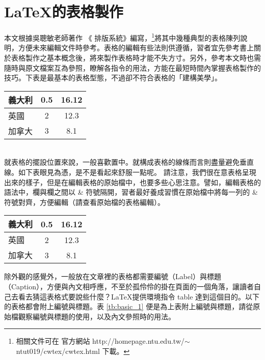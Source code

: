 %
\chapter{ \LaTeX  {\MB 的表格製作}}
本文根據吳聰敏老師著作 《\cw{} 排版系統》編寫，\footnote{相關文件可在 \cw{} 官方網站  http://homepage.ntu.edu.tw/$\sim$ntut019/cwtex/cwtex.html 下載。}將其中幾種典型的表格陳列說明，方便未來編輯文件時參考。表格的編輯有些法則供遵循，習者宜先參考書上關於表格製作之基本概念後，將來製作表格時才能不失方寸。另外，參考本文時也需隨時與原文檔案互為參照，瞭解各指令的用法，方能在最短時間內掌握表格製作的技巧。下表是最基本的表格型態，不過卻不符合表格的「建構美學」。\\

\begin{tabular}{|l|c|c|}%
\hline  %
  義大利	& 0.5	& 16.12		\\\hline  %
  英國	& 2     	& 12.3		\\\hline
  加拿大	& 3     	& 8.1		\\\hline
\end{tabular}\\

就表格的擺設位置來說，一般喜歡置中。就構成表格的線條而言則盡量避免垂直線。如下表眼見為憑，是不是看起來舒服一點呢。
請注意，我們很在意表格呈現出來的樣子，但是在編輯表格的原始檔中，也要多些心思注意。譬如，編輯表格的語法中，欄與欄之間以 \& 符號隔開，習者最好養成習慣在原始檔中將每一列的 \& 符號對齊，方便編輯（請查看原始檔的表格編輯）。\\

\begin{center} %
\begin{tabular}{lcc}  %
\hline
  義大利	& 0.5	& 16.12		\\\hline  %
  英國   & 2     	& 12.3		\\\hline
  加拿大 	& 3     	& 8.1		\\\hline
\end{tabular}
\end{center}
\bigskip
除外觀的感覺外，一般放在文章裡的表格都需要編號（Label）與標題（Caption），方便與內文相呼應，不至於孤伶伶的掛在頁面的一個角落，讓讀者自己去看去猜這表格式要說些什麼？\LaTeX 提供環境指令 {\A table} 達到這個目的。以下的表格都會附上編號與標題。表 \ref{tb:basic_1} 便是為上表附上編號與標題，請從原始檔觀察編號與標題的使用，以及內文參照時的用法。

